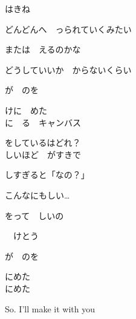 {はきね

どんどんへ　っられていくみたい

または　えるのかな

どうしていいか　からないくらい

が　のを

けに　めた
\\

に　る　キャンバス

をしているはどれ？
\\

しいほど　がすきで

しすぎると「なの？」

こんなにもしい…

をって　しいの

　けとう

が　のを

にめた
\\

にめた

So. I'll make it with you

}